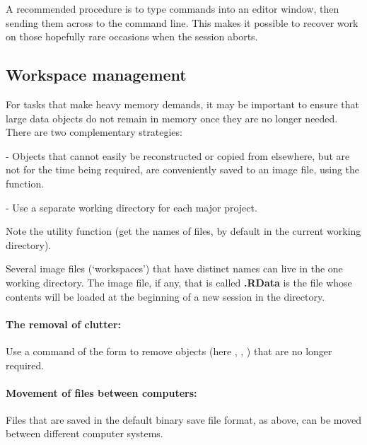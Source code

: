 A recommended procedure
is to type commands into an editor window,
then sending them across to the command line. This makes it possible
to recover work on those hopefully rare occasions when the
session aborts.

\subsection{Workspace management}

For tasks that make heavy memory demands, it may be important to
ensure that large data objects do not remain in memory once they are
no longer needed. There are two complementary strategies:
\begin{itemizz}
\item[-] Objects that cannot easily be reconstructed or copied from elsewhere,
but are not for the time being required, are conveniently saved
to an image file, using the  function.

\item[-] Use a separate working directory for each major project.
\end{itemizz}

Note the utility function   (get the names of files, by
default in the current working directory).

Several image files (`workspaces') that have distinct names can live
in the one working directory.  The image file, if any, that is called
\textbf{.RData} is the file whose contents will be loaded at the
beginning of a new session in the directory.

\paragraph{The removal of clutter:}
Use a command of the form  to remove
objects (here , , ) that are no longer
required.

\paragraph{Movement of files between computers:}\label{ss:dump}
Files that are saved in the default binary save file format, as above,
can be moved between different computer systems.

